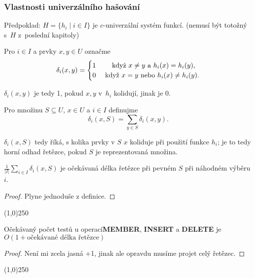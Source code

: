 \documentclass[a4paper,12pt]{article}
\newenvironment{myproof}{
  \begin{proof}
    
  }{
  \end{proof}
  \begin{center}
   \line(1,0){250}
   \end{center}
  }
\begin{document}
\subsubsection{Vlastnosti univerzálního hašování}
Předpoklad: $H=\{h_i\mid i\in I\}$ je $c$-univerzální systém funkcí. (nemusí být totožný s~$H$ z~poslední kapitoly)

\begin{definice}
     Pro $i\in I$ a prvky $x,y\in U$ 
označme 
$$\delta_i(x,y)=\begin{cases} 1&\quad\text{\rm\ když }x\ne y\text{\rm\ a }
h_i(x)=h_i(y),\\
0&\text{\rm\ když }x=y\text{\rm\ nebo }h_i(x)\ne h_i(y).\end{cases} $$
\end{definice}
$\delta_i(x,y)$ je tedy 1, pokud $x,y$ v~$h_i$ kolidují, jinak je 0.

\begin{definice}
Pro množinu $S\subseteq U$, $x\in U$ a $i\in I$ definujme
$$\delta_i(x,S)=\sum_{y\in S}\delta_i(x,y).$$
\end{definice}
$\delta_i(x,S)$ tedy říká, s kolika prvky v $S$ $x$ koliduje při použití funkce $h_i$; je to tedy horní odhad řetězce, pokud $S$ je reprezentovaná množina.

\begin{lemma}
    $\frac 1{|I|}\sum_{i\in I}\delta_i(x,S)$ je očekávaná délka řetězce při pevném $S$ při náhodném výběru $i$. 
\end{lemma}
\begin{myproof}
    Plyne jednoduše z definice.
\end{myproof}

\begin{lemma}
    Očekávaný počet testů u operací{\bf MEMBER}, {\bf INSERT} a {\bf DELETE} je $O(1+\mbox{očekávané délka řetězce})$
\end{lemma}
\begin{myproof}
    Není mi zcela jasná +1, jinak ale opravdu musíme projet celý řetězec.
\end{myproof}
\end{document}
